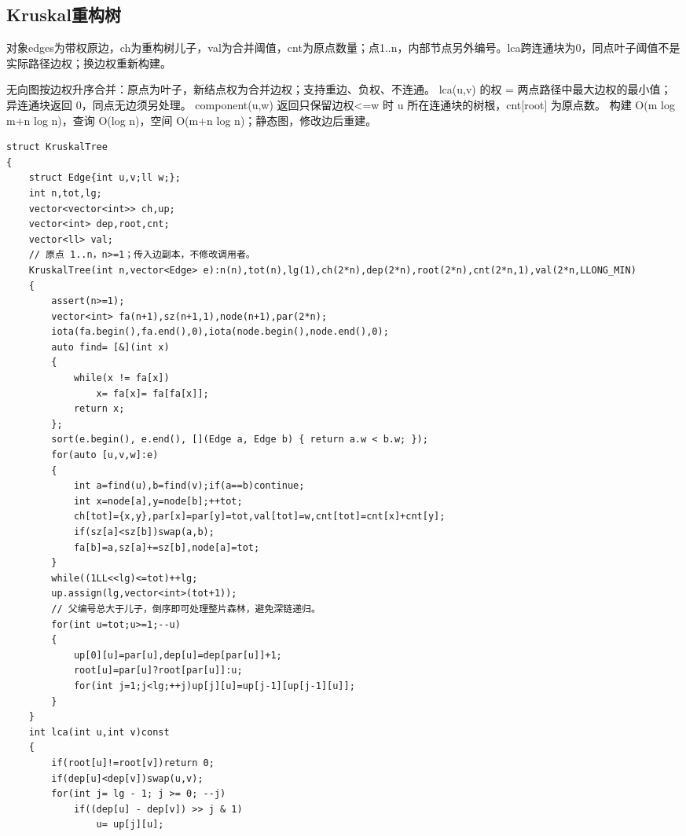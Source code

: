 \documentclass[UTF8,fontset=fandol,a4paper,twoside]{ctexart}
\newcommand{\note}[1]{{\fontsize{10}{12}\selectfont #1\par}}
\begin{document}
\begin{multicols}{2}
\subsection{Kruskal重构树}

\note{对象edges为带权原边，ch为重构树儿子，val为合并阈值，cnt为原点数量；点1.\allowbreak{}.\allowbreak{}n，内部节点另外编号。lca跨连通块为0，同点叶子阈值不是实际路径边权；换边权重新构建。}
\note{无向图按边权升序合并：原点为叶子，新结点权为合并边权；支持重边、负权、不连通。 lca(\allowbreak{}u,\allowbreak{}v)\allowbreak{} 的权 =\allowbreak{} 两点路径中最大边权的最小值；异连通块返回 0，同点无边须另处理。 component(\allowbreak{}u,\allowbreak{}w)\allowbreak{} 返回只保留边权<\allowbreak{}=\allowbreak{}w 时 u 所在连通块的树根，cnt[\allowbreak{}root]\allowbreak{} 为原点数。 构建 O(\allowbreak{}m log m+\allowbreak{}n log n)\allowbreak{}，查询 O(\allowbreak{}log n)\allowbreak{}，空间 O(\allowbreak{}m+\allowbreak{}n log n)\allowbreak{}；静态图，修改边后重建。}
\begin{lstlisting}
struct KruskalTree
{
    struct Edge{int u,v;ll w;};
    int n,tot,lg;
    vector<vector<int>> ch,up;
    vector<int> dep,root,cnt;
    vector<ll> val;
    // 原点 1..n，n>=1；传入边副本，不修改调用者。
    KruskalTree(int n,vector<Edge> e):n(n),tot(n),lg(1),ch(2*n),dep(2*n),root(2*n),cnt(2*n,1),val(2*n,LLONG_MIN)
    {
        assert(n>=1);
        vector<int> fa(n+1),sz(n+1,1),node(n+1),par(2*n);
        iota(fa.begin(),fa.end(),0),iota(node.begin(),node.end(),0);
        auto find= [&](int x)
        {
            while(x != fa[x])
                x= fa[x]= fa[fa[x]];
            return x;
        };
        sort(e.begin(), e.end(), [](Edge a, Edge b) { return a.w < b.w; });
        for(auto [u,v,w]:e)
        {
            int a=find(u),b=find(v);if(a==b)continue;
            int x=node[a],y=node[b];++tot;
            ch[tot]={x,y},par[x]=par[y]=tot,val[tot]=w,cnt[tot]=cnt[x]+cnt[y];
            if(sz[a]<sz[b])swap(a,b);
            fa[b]=a,sz[a]+=sz[b],node[a]=tot;
        }
        while((1LL<<lg)<=tot)++lg;
        up.assign(lg,vector<int>(tot+1));
        // 父编号总大于儿子，倒序即可处理整片森林，避免深链递归。
        for(int u=tot;u>=1;--u)
        {
            up[0][u]=par[u],dep[u]=dep[par[u]]+1;
            root[u]=par[u]?root[par[u]]:u;
            for(int j=1;j<lg;++j)up[j][u]=up[j-1][up[j-1][u]];
        }
    }
    int lca(int u,int v)const
    {
        if(root[u]!=root[v])return 0;
        if(dep[u]<dep[v])swap(u,v);
        for(int j= lg - 1; j >= 0; --j)
            if((dep[u] - dep[v]) >> j & 1)
                u= up[j][u];

\end{lstlisting}
\end{multicols}
\end{document}
